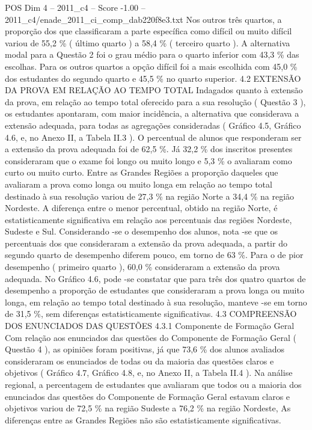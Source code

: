 \begin{textsample}{POS Dim 4 – 2011\_c4 – Score -1.00 – 2011\_c4/enade\_2011\_ci\_comp\_dab220f8e3.txt}
Nos outros três quartos, a proporção dos que classificaram a parte específica como difícil ou muito difícil variou de 55,2 \% ( último quarto ) a 58,4 \% ( terceiro quarto ).
A alternativa modal para a Questão 2 foi o grau médio para o quarto inferior com 43,3 \% das escolhas.
Para os outros quartos a opção difícil foi a mais escolhida com 45,0 \% dos estudantes do segundo quarto e 45,5 \% no quarto superior. 4.2 EXTENSÃO DA PROVA EM RELAÇÃO AO TEMPO TOTAL Indagados quanto à extensão da prova, em relação ao tempo total oferecido para a sua resolução ( Questão 3 ), os estudantes apontaram, com maior incidência, a alternativa que considerava a extensão adequada, para todas as agregações consideradas ( Gráfico 4.5, Gráfico 4.6, e, no Anexo II, a Tabela II.3 ).
O percentual de alunos que responderam ser a extensão da prova adequada foi de 62,5 \%.
Já 32,2 \% dos inscritos presentes consideraram que o exame foi longo ou muito longo e 5,3 \% o avaliaram como curto ou muito curto.
Entre as Grandes Regiões a proporção daqueles que avaliaram a prova como longa ou muito longa em relação ao tempo total destinado à sua resolução variou de 27,3 \% na região Norte a 34,4 \% na região Nordeste.
A diferença entre o menor percentual, obtido na região Norte, é estatisticamente significativa em relação aos percentuais das regiões Nordeste, Sudeste e Sul.
Considerando -se o desempenho dos alunos, nota -se que os percentuais dos que consideraram a extensão da prova adequada, a partir do segundo quarto de desempenho diferem pouco, em torno de 63 \%.
Para o de pior desempenho ( primeiro quarto ), 60,0 \% consideraram a extensão da prova adequada.
No Gráfico 4.6, pode -se constatar que para três dos quatro quartos de desempenho a proporção de estudantes que consideraram a prova longa ou muito longa, em relação ao tempo total destinado à sua resolução, manteve -se em torno de 31,5 \%, sem diferenças estatisticamente significativas. 4.3 COMPREENSÃO DOS ENUNCIADOS DAS QUESTÕES 4.3.1 Componente de Formação Geral Com relação aos enunciados das questões do Componente de Formação Geral ( Questão 4 ), as opiniões foram positivas, já que 73,6 \% dos alunos avaliados consideraram os enunciados de todas ou da maioria das questões claros e objetivos ( Gráfico 4.7, Gráfico 4.8, e, no Anexo II, a Tabela II.4 ).
Na análise regional, a percentagem de estudantes que avaliaram que todos ou a maioria dos enunciados das questões do Componente de Formação Geral estavam claros e objetivos variou de 72,5 \% na região Sudeste a 76,2 \% na região Nordeste, As diferenças entre as Grandes Regiões não são estatisticamente significativas.

\end{textsample}
